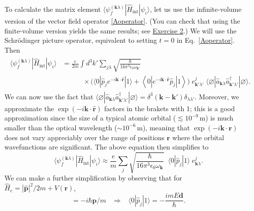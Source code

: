 \documentclass[prx,12pt]{revtex4-2}
\begin{document}
To calculate the matrix element $\langle
\psi_{f}^{(\mathbf{k}\lambda)}| \hat{H}_{\mathrm{int}}|\psi_i\rangle$,
let us use the infinite-volume version of the vector field operator
\eqref{Aoperator}.  (You can check that using the finite-volume
version yields the same results; see
\hyperref[ex:alpha_finite]{Exercise 2}.)  We will use the
Schr\"odinger picture operator, equivalent to setting $t = 0$ in
Eq.~\eqref{Aoperator}.  Then
\begin{align}
  \begin{aligned}
    \langle \psi_{f}^{(\mathbf{k}\lambda)}| \hat{H}_{\mathrm{int}}|\psi_i\rangle
    &= \frac{e}{2m} \int d^3 k' \sum_{j\lambda}
  \sqrt{\frac{\hbar}{16\pi^3\epsilon_0 \omega_{\mathbf{k}'}}} \\
  &\qquad\quad\times
  \Big(
  \langle 0 |\hat{p}_j e^{-i\mathbf{k}\cdot\hat{\mathbf{r}}} | 1 \rangle
  + \left\langle 0 |e^{-i\mathbf{k}\cdot\hat{\mathbf{r}}} \hat{p}_j| 1 \right\rangle
  \Big) \; e_{\mathbf{k}'\lambda'}^j \;
  \langle\varnothing|\hat{a}_{\mathbf{k}\lambda}
  \hat{a}_{\mathbf{k}'\lambda'}^\dagger|\varnothing\rangle.
  \end{aligned}
\end{align}
We can now use the fact that
$\langle\varnothing|\hat{a}_{\mathbf{k}\lambda}
\hat{a}_{\mathbf{k}'\lambda'}^\dagger|\varnothing\rangle =
\delta^3(\mathbf{k}-\mathbf{k}') \delta_{\lambda\lambda'}$.  Moreover,
we approximate the $\exp(-i\mathbf{k}\cdot\hat{\mathbf{r}})$ factors
in the brakets with 1; this is a good approximation since the size of
a typical atomic orbital ($\lesssim 10^{-9}\,\textrm{m}$) is much
smaller than the optical wavelength ($\sim 10^{-6}\,\textrm{m}$),
meaning that $\exp(-i\mathbf{k}\cdot\mathbf{r})$ does not vary
appreciably over the range of positions $\mathbf{r}$ where the orbital
wavefunctions are significant.  The above equation then simplifies to
\begin{equation}
  \langle \psi_{f}^{(\mathbf{k}\lambda)}| \hat{H}_{\mathrm{int}}|\psi_i\rangle
  \approx \frac{e}{m} \sum_{j}
  \sqrt{\frac{\hbar}{16\pi^3\epsilon_0 \omega_{\mathbf{k}}}} \;\;
  \langle 0 |\hat{p}_j|1 \rangle \; e_{\mathbf{k}\lambda}^j.
\end{equation}
We can make a further simplification by observing that for $\hat{H}_e
= |\hat{\mathbf{p}}|^2/2m + V(\mathbf{r})$,
\begin{equation}
  [\hat{H}_e, \hat{\mathbf{r}}] = -i\hbar\mathbf{p}/m \;\;\;\Rightarrow \;\;\;
  \langle 0|\hat{p}_j|1\rangle = - \frac{imE \mathbf{d}}{\hbar}.
\end{equation}
\end{document}

